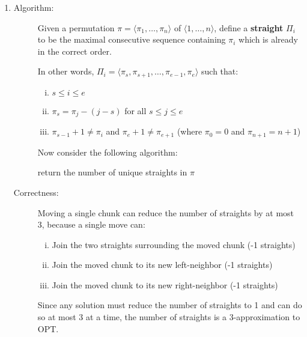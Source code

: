 \documentclass{article}
\def\O{{\sf OPT}\xspace}
\begin{document}
\begin{enumerate}
\begin{description}
\end{description}


\item
\begin{description}

\item[Algorithm:]
Given a permutation $\pi = \langle \pi_1, \ldots, \pi_n \rangle$ of $\langle 1, \ldots, n \rangle$, define a {\bf straight} $\Pi_i$ to be the maximal consecutive sequence containing $\pi_i$ which is already in the correct order.

In other words, $\Pi_i = \langle \pi_s, \pi_{s+1}, \ldots, \pi_{e-1}, \pi_e \rangle$ such that:
\begin{enumerate}[i.]
\item $s \leq i \leq e$
\item $\pi_s = \pi_j - (j - s)$ for all $s \leq j \leq e$
\item $\pi_{s-1} + 1 \neq \pi_i$ and $\pi_e + 1 \neq \pi_{e+1}$ (where $\pi_0 = 0$ and $\pi_{n+1} = n+1$)
\end{enumerate}

Now consider the following algorithm:
\begin{code}
return the number of unique straights in $\pi$
\end{code}

\item[Correctness:]
Moving a single chunk can reduce the number of straights by at most 3, because a single move can:
\begin{enumerate}[i.]
\item Join the two straights surrounding the moved chunk (-1 straights)
\item Join the moved chunk to its new left-neighbor (-1 straights)
\item Join the moved chunk to its new right-neighbor (-1 straights)
\end{enumerate}
Since any solution must reduce the number of straights to 1 and can do so at most 3 at a time, the number of straights is a 3-approximation to \O.

\end{description}


\end{enumerate}
\end{document}
